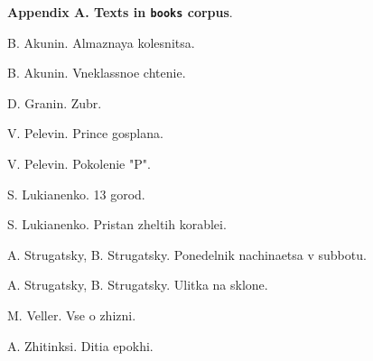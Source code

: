 \documentclass[11pt,letterpaper]{article}
\begin{document}



{\bf Appendix A. Texts in {\tt books} corpus}.

B. Akunin. Almaznaya kolesnitsa. 

B. Akunin. Vneklassnoe chtenie.

D. Granin. Zubr. 

V. Pelevin. Prince gosplana.

V. Pelevin. Pokolenie "P". 

S. Lukianenko. 13 gorod.

S. Lukianenko. Pristan zheltih korablei.

A. Strugatsky, B. Strugatsky. Ponedelnik nachinaetsa v subbotu.

A. Strugatsky, B. Strugatsky. Ulitka na sklone. 

M. Veller. Vse o zhizni.

A. Zhitinksi. Ditia epokhi.
\end{document}
